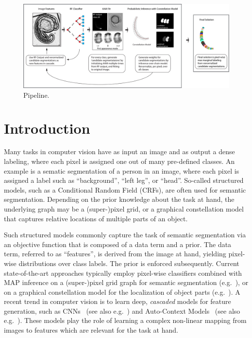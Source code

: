 \documentclass[10pt,twocolumn,letterpaper]{article}
\begin{document}
\begin{figure}[t]
\begin{center}
\includegraphics[width=\textwidth]{pipelineBIG.jpg} %
\caption{Pipeline.}
\label{fig:pipeline}
\end{center}
\end{figure}


\section{Introduction}
Many tasks in computer vision have as input an image and as output a dense labeling, where each pixel is assigned one out of many pre-defined classes. An example is a sematic segmentation of a person in an image, where each pixel is assigned a label such as “background”, “left leg”, or “head”. 
%
So-called structured models, such as a Conditional Random Field (CRFs), are often used for semantic segmentation. 
Depending on the prior knowledge about the task at hand, the underlying graph may be a (super-)pixel grid, or a graphical constellation model that captures relative locations of multiple parts of an object. 
%

Such structured models commonly capture the task of semantic segmentation via an objective function that is composed of a data term and a prior. 
%
The data term, referred to as ``features'', is derived from the image at hand, yielding pixel-wise distributions over class labels. The prior is enforced subsequently. 
%
%
Current state-of-the-art approaches typically employ pixel-wise classifiers combined with MAP inference on a (super-)pixel grid graph for semantic segmentation (e.g.\ \cite{funke2014candidate,}), or on a graphical constellation model for the localization of object parts (e.g.\ \cite{Glocker2012,Glocker2013,TeethMICCAI2012,SeifertAnatomicalSPIE2009}).  
%
A recent trend in computer vision is to learn deep, \emph{cascaded} models for feature generation, such as CNNs~\cite{NIPS2012_4824} (see also e.g.\ \cite{funke2014candidate}) and Auto-Context Models~\cite{AutoContext2008} (see also e.g.\ \cite{PoseMachinesECCV2014}). 
%
These models play the role of learning a complex non-linear mapping from images to features which are relevant for the task at hand. 
\end{document}
